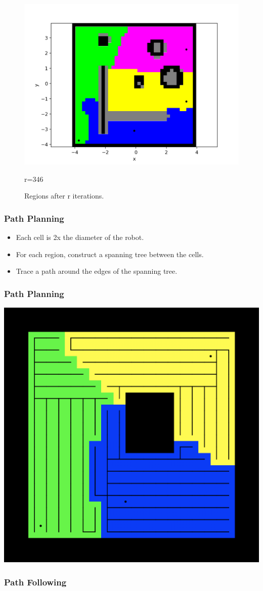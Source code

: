 \documentclass{beamer}
\begin{document}
\begin{frame}
\begin{figure}[H]
\begin{minipage}{0.3\textwidth}
    			\includegraphics[width=\linewidth]{DARPImages/346}
    			\caption{r=346}
    		\end{minipage}
		
			\caption{Regions after r iterations.} \label{fig:4pics}
		\end{figure}
	\end{frame}
	\begin{frame}
		\frametitle{Path Planning}
		\begin{itemize}
			\item<2-> Each cell is 2x the diameter of the robot.
			\item<3-> For each region, construct a spanning tree between the cells.
			\item<4-> Trace a path around the edges of the spanning tree.
		\end{itemize}
	\end{frame}
	\begin{frame}
		\frametitle{Path Planning}
		\centering
			\includegraphics[width=0.7\linewidth]{SpanningTreeExample}
	\end{frame}
	\begin{frame}
		\frametitle{Path Following}
		
	\end{frame}
\end{document}
